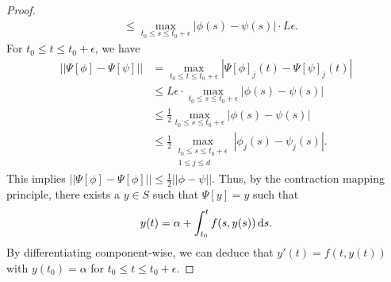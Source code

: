 \documentclass{article}
\begin{document}
\begin{proof}
\begin{align*}
            &\leq \max_{t_0 \leq s \leq t_0 + \epsilon} | \phi(s) - \psi(s) | \cdot L\epsilon.
        \end{align*}
    For $t_0 \leq t \leq t_0 + \epsilon$, we have 
        \begin{align*}
            ||\Psi[\phi] - \Psi[\psi]|| &= \max_{t_0 \leq t \leq t_0 + \epsilon} | \Psi[\phi]_j (t) - \Psi[\psi]_j(t)| \\
            &\leq L \epsilon \cdot \max_{t_0 \leq s \leq t_0 + \epsilon}|\phi(s) - \psi(s)| \\
            &\leq \frac{1}{2} \max_{t_0 \leq s \leq t_0 + \epsilon} |\phi(s) - \psi(s)| \\
            &\leq \frac{1}{2}\max_{\substack{t_0 \leq s \leq t_0 + \epsilon \\ 1 \leq j \leq d}} |\phi_j(s) - \psi_j(s)|. 
        \end{align*}
    This implies $||\Psi[\phi] - \Psi[\phi] || \leq \frac{1}{2} ||\phi - \psi ||$. Thus, by the contraction mapping principle, there exists a $y \in S$ such that $\Psi[y] = y$ such that 
        \[
            y(t) = \alpha + \int_{t_0}^t f(s, y(s))\, \text{d}s.
        \]
    By differentiating component-wise, we can deduce that $y'(t) = f(t, y(t))$ with $y(t_0) = \alpha$ for $t_0 \leq t \leq t_0 + \epsilon$. 
\end{proof}



\end{document}
